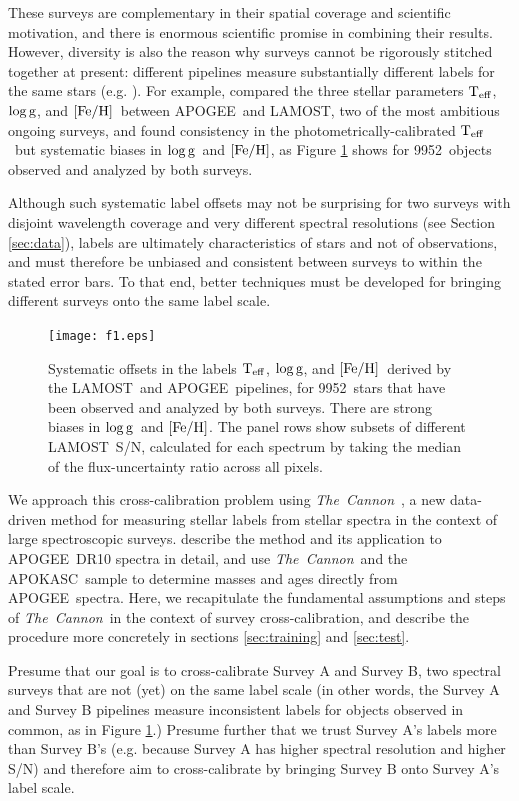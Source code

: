 \documentclass[12pt, letterpaper, preprint]{aastex}
\newcommand{\tc}{\textsl{The~Cannon}}
\newcommand{\apogee}{APOGEE}
\newcommand{\lamost}{LAMOST}
\newcommand{\apokasc}{APOKASC}
\newcommand{\teff}{\mbox{$\rm T_{eff}$}}
\newcommand{\feh}{\mbox{$\rm [Fe/H]$}}
\newcommand{\logg}{\mbox{$\rm \log g$}}
\newcommand{\ntrobj}{9952}
\newcommand{\snr}{S/N}
\begin{document}
These surveys are complementary in their spatial coverage and scientific motivation,
and there is enormous scientific promise in combining their results.
However, diversity is also the reason why surveys cannot be rigorously stitched together at present:
different pipelines measure substantially different labels for the same stars (e.g. \citet{Smiljanic2014}). 
For example, \citet{Chen2015} compared the three stellar parameters \teff, \logg, and \feh\ between \apogee\ and \lamost, two of the most ambitious ongoing surveys, and found consistency in the photometrically-calibrated \teff\
but systematic biases in \logg\ and \feh, as 
Figure \ref{fig:apogee-lamost} shows for \ntrobj\ objects 
observed and analyzed by both surveys. 

Although such systematic label offsets may not be surprising for two surveys with disjoint wavelength coverage and very different spectral resolutions (see Section \ref{sec:data}), labels are ultimately characteristics of stars and not of observations, and must therefore be unbiased and consistent between surveys to within the stated error bars.
To that end, better techniques must be developed for bringing different surveys onto the same label scale. 

\begin{figure}[!p]
\centering
\texttt{[image: f1.eps]}
\caption{Systematic offsets in the labels
\teff, \logg, and \feh\
derived by the \lamost\ and \apogee\ pipelines, for \ntrobj\ stars that
have been observed and analyzed by both surveys.
There are strong biases in \logg\ and \feh.
The panel rows show subsets of different \lamost\ \snr, calculated for each spectrum by taking
the median of the flux-uncertainty ratio across all pixels.
}
\label{fig:apogee-lamost}
\end{figure}

We approach this cross-calibration problem using \tc\ \citep{Ness2015}, a new data-driven method for measuring stellar labels from stellar spectra in the context of large spectroscopic surveys. 
\citet{Ness2015} describe the method and its application to \apogee\ DR10 spectra in detail, and \citet{NessAges} use \tc\ and the \apokasc\ sample to determine masses and ages directly from \apogee\ spectra. 
Here, we recapitulate the fundamental assumptions and steps
of \tc\ in the context of survey cross-calibration, and
describe the procedure more concretely in sections 
\ref{sec:training} and \ref{sec:test}. 

Presume that our goal is to cross-calibrate Survey A and Survey B,
two spectral surveys that are not (yet) on the same label scale (in other words, the Survey A and Survey B pipelines measure inconsistent labels for objects
observed in common, as in Figure \ref{fig:apogee-lamost}.) 
Presume further that we trust Survey A's labels more than Survey B's
(e.g. because Survey A has higher spectral resolution and higher \snr) and therefore aim to cross-calibrate by bringing Survey B onto Survey A's label scale.
\end{document}

